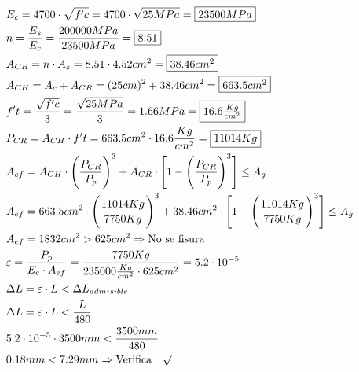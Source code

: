 \begin{enumerate}
\begin{itemize}
\begin{align*}
& E_c = 4700 \cdot \sqrt{f'c} = 4700 \cdot \sqrt{25MPa} = \framebox{$23500 MPa$}\\
& n = \frac{E_s}{E_c} = \frac{200000MPa}{23500MPa} = \framebox{8.51}\\
& A_{CR} = n \cdot A_s = 8.51 \cdot 4.52 cm^2 = \framebox{$38.46 cm^2$}\\
& A_{CH} = A_c + A_{CR} = (25cm)^2 + 38.46cm^2 = \framebox{$663.5 cm^2$}\\
& f't = \frac{\sqrt{f'c}}{3} = \frac{\sqrt{25MPa}}{3} = 1.66 MPa = \framebox{$16.6 \frac{Kg}{cm^2}$}\\
& P_{CR} = A_{CH} \cdot f't = 663.5 cm^2 \cdot 16.6 \frac{Kg}{cm^2} = \framebox{$11014 Kg$}\\
& A_{ef} = A_{CH} \cdot \Bigg(\frac{P_{CR}}{P_p} \Bigg)^3 + A_{CR} \cdot \Bigg[1-\Bigg(\frac{P_{CR}}{P_p} \Bigg)^3 \Bigg] \leq A_g\\
& A_{ef} = 663.5 cm^2 \cdot \Bigg(\frac{11014Kg}{7750Kg} \Bigg)^3 + 38.46 cm^2 \cdot \Bigg[1-\Bigg(\frac{11014Kg}{7750Kg} \Bigg)^3 \Bigg] \leq A_g\\
& A_{ef} = 1832 cm^2 > 625 cm^2 \Rightarrow \text{No se fisura}\\
& \varepsilon = \frac{P_p}{E_c \cdot A_{ef}} = \frac{7750Kg}{235000 \frac{Kg}{cm^2} \cdot 625 cm^2} = 5.2 \cdot 10^{-5}\\
& \Delta L = \varepsilon \cdot L < \Delta L_{admisible}\\
& \Delta L = \varepsilon \cdot L < \frac{L}{480}\\
& 5.2 \cdot 10^{-5} \cdot 3500mm < \frac{3500mm}{480}\\
& 0.18mm < 7.29mm \Rightarrow \text{Verifica} \quad \surd
\end{align*}

\end{itemize}
\end{enumerate}